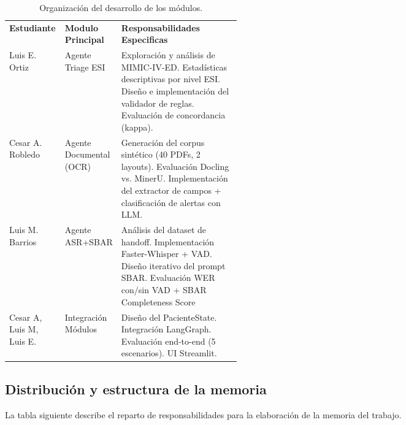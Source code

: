 \begin{table}[H]
  \centering
  \small
  \caption{Organización del desarrollo de los módulos.}
  \label{tab:modules}
  \begingroup
  \begin{tabularx}{\linewidth}{|>{\raggedright\arraybackslash}p{0.24\linewidth}|>{\raggedright\arraybackslash}p{0.20\linewidth}|>{\raggedright\arraybackslash}X|}
  \hline
  \rowcolor{unirTableHeader}
  \multicolumn{3}{|c|}{\textcolor{white}{\textbf{Organización del desarrollo de los módulos.}}} \\
  \hline
  \rowcolor{unirTableBand}
  \textbf{Estudiante} & \textbf{Modulo Principal} & \textbf{Responsabilidades Especificas} \\
  \hline
  Luis E. Ortiz &
  Agente Triage ESI & Exploración y análisis de MIMIC-IV-ED. Estadísticas descriptivas por nivel ESI. Diseño e implementación del validador de reglas. Evaluación de concordancia (kappa). \\
  \hline
  \rowcolor{unirTableBand}
  Cesar A. Robledo &
  Agente Documental (OCR) &
Generación del corpus sintético (40 PDFs, 2 layouts). Evaluación Docling vs. MinerU. Implementación del extractor de campos + clasificación de alertas con LLM. \\
  \hline
  Luis M. Barrios  &
Agente ASR+SBAR  &
  Análisis del dataset de handoff. Implementación Faster-Whisper + VAD. Diseño iterativo del prompt SBAR. Evaluación WER con/sin VAD + SBAR Completeness Score \\
  \hline
  \rowcolor{unirTableBand}
  Cesar A, Luis M, Luis E.  &
Integración Módulos  & Diseño del PacienteState. Integración LangGraph. Evaluación end-to-end (5 escenarios). UI Streamlit.  \\
  \hline
  \end{tabularx}
  \endgroup
\end{table}


\subsection*{Distribución y estructura de la memoria}
La tabla siguiente describe el reparto de responsabilidades para la elaboración de la memoria del trabajo.


